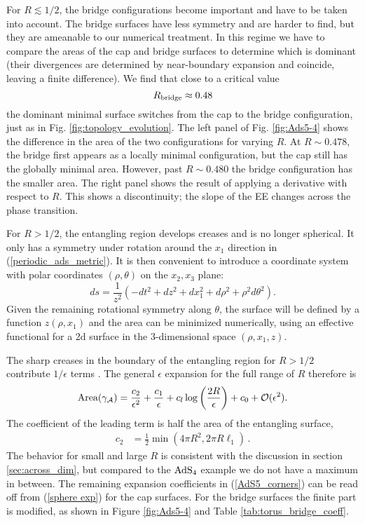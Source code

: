 \documentclass[11 pt]{article}
\begin{document}
For $R\lesssim 1/2$, the bridge configurations become important and have to be taken into account. The bridge surfaces have less symmetry and are harder to find, but they are ameanable to our numerical treatment. In this regime we have to compare the areas of the cap and bridge surfaces to determine which is dominant (their divergences are determined by near-boundary expansion and coincide, leaving a finite difference).
We find that close to a critical value $$R_{\rm bridge}\approx 0.48$$ the dominant minimal surface switches from the cap to the bridge configuration, just as in Fig. \ref{fig:topology_evolution}. The left panel of Fig. \ref{fig:Ads5-4} shows the difference in the area of the two configurations for varying $R$. At $R\sim0.478$, the bridge first appears as a locally minimal configuration, but the cap still has the globally minimal area. However, past $R\sim0.480$ the bridge configuration has the smaller area. The right panel shows the result of applying a derivative with respect to $R$. This shows a discontinuity; the slope of the EE changes across the phase transition.




For $R>1/2$, the entangling region develops creases and is no longer spherical. It only has a symmetry under rotation around the $x_1$ direction in (\ref{periodic_ads_metric}). It is then convenient to introduce a  coordinate system with polar coordinates $(\rho,\theta)$ on the $x_2,x_3$ plane: 
$$ds=\frac{1}{z^2}\left(-dt^2+dz^2+dx_1^2+d\rho^2+\rho^2d\theta^2\right).$$
Given the remaining rotational symmetry along $\theta$, the surface will be defined by a function $z(\rho,x_1)$ and the area can be minimized numerically, using an effective functional for a 2d surface in the 3-dimensional space $(\rho, x_1, z)$.

The sharp creases in the boundary of the entangling region for $R>1/2$ contribute $1/\epsilon$ terms \cite{Myers2012}. The general $\epsilon$ expansion for the full range of $R$ therefore is
\begin{equation}
    \text{Area}(\gamma_{\cal A}) =\frac{c_2}{\epsilon^2} + \frac{c_1}{\epsilon} + c_l\log\left(\frac{2R}{\epsilon}\right) + c_0 + \mathcal{O}(\epsilon^2).
    \label{AdS5_corners}
\end{equation}
The coefficient of the leading term is half the area of the entangling surface,
\begin{align}
c_2&=\frac{1}{2}\min\left(4\pi R^2,2\pi R \ell_1\right)\,.
\end{align}
The behavior for small and large $R$ is consistent with the discussion in section \ref{sec:across_dim}, but compared to the $\rm AdS_4$ example we do not have a maximum in between.
The remaining expansion coefficients in (\ref{AdS5_corners}) can be read off from (\ref{sphere exp}) for the cap surfaces. For the bridge surfaces the finite part is modified, as shown in Figure \ref{fig:Ads5-4} and Table \ref{tab:torus_bridge_coeff}.
\end{document}
